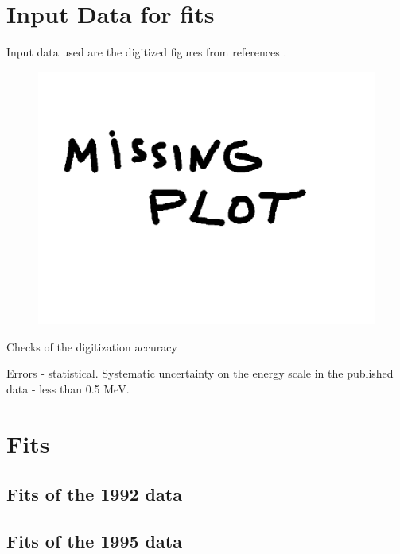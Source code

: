 \documentclass[12pt]{article}
\newcommand {\red}          {\color{red}}
\begin{document}
\section { Input Data for fits}

Input data used are the digitized figures from references
\cite{RMC_1992_PhysRevC.46.1094,RMC_1999_PhysRevC.59.2853}.

\begin{figure}[htbp]
 \begin{center}
 \includegraphics[width=0.7\columnwidth]{png/missing_plot} 
 \end{center}
 \caption{\red{ \bf Caption}}
 \label{p004}
 \end{figure}
Checks of the digitization accuracy

Errors - statistical. Systematic uncertainty on the energy scale in the
published data - less than 0.5 MeV.

\section { Fits }


\subsection { Fits of the 1992 data }

\subsection { Fits of the 1995 data }

\end{document}
